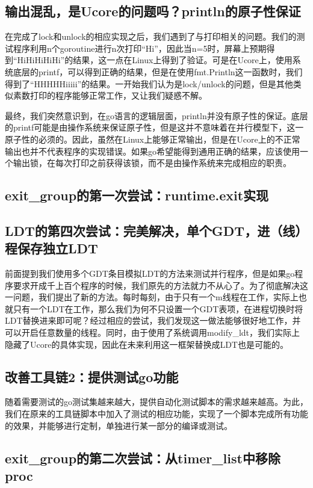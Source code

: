 \documentclass{article}
\begin{document}
\subsection{输出混乱，是Ucore的问题吗？println的原子性保证}
在完成了lock和unlock的相应实现之后，我们遇到了与打印相关的问题。我们的测试程序利用n个goroutine进行n次打印“Hi”，因此当n=5时，屏幕上预期得到“HiHiHiHiHi”的结果，这一点在Linux上得到了验证。可是在Ucore上，使用系统底层的printf，可以得到正确的结果，但是在使用fmt.Println这一函数时，我们得到了“HHHHHiiiii”的结果。一开始我们认为是lock/unlock的问题，但是其他类似素数打印的程序能够正常工作，又让我们疑惑不解。

最终，我们突然意识到，在go语言的逻辑层面，println并没有原子性的保证。底层的printf可能是由操作系统来保证原子性，但是这并不意味着在并行模型下，这一原子性的必须的。因此，虽然在Linux上能够正常输出，但是在Ucore上的不正常输出也并不代表程序的实现错误。如果go希望能得到通用正确的结果，应该使用一个输出锁，在每次打印之前获得该锁，而不是由操作系统来完成相应的职责。

\subsection{exit\_group的第一次尝试：runtime.exit实现}

\subsection{LDT的第四次尝试：完美解决，单个GDT，进（线）程保存独立LDT}
前面提到我们使用多个GDT条目模拟LDT的方法来测试并行程序，但是如果go程序要求开成千上百个程序的时候，我们原先的方法就力不从心了。为了彻底解决这一问题，我们提出了新的方法。每时每刻，由于只有一个m线程在工作，实际上也就只有一个LDT在工作，那么我们为何不只设置一个GDT表项，在进程切换时将LDT替换进来即可呢？经过相应的尝试，我们发现这一做法能够很好地工作，并可以开启任意数量的线程。同时，由于使用了系统调用modify\_ldt，我们实际上隐藏了Ucore的具体实现，因此在未来利用这一框架替换成LDT也是可能的。

\subsection{改善工具链2：提供测试go功能}
随着需要测试的go测试集越来越大，提供自动化测试脚本的需求越来越高。为此，我们在原来的工具链脚本中加入了测试的相应功能，实现了一个脚本完成所有功能的效果，并能够进行定制，单独进行某一部分的编译或测试。

\subsection{exit\_group的第二次尝试：从timer\_list中移除proc}
\end{document}
